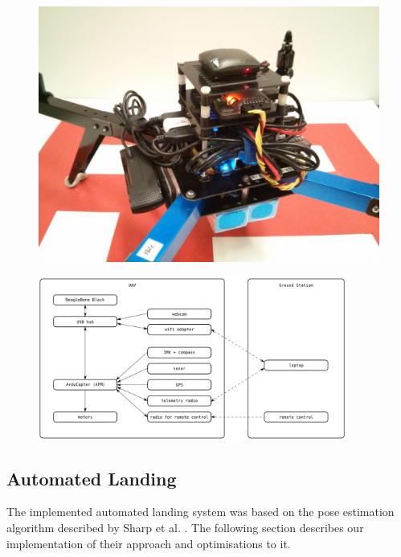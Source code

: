 \documentclass{acm_proc_article-sp}
\begin{document}
\begin{figure}
\centering
\begin{minipage}{.5\textwidth}
  \centering
  \includegraphics[width=.7\linewidth]{images/hardware.jpg}
  \label{fig:hardware-photo}
\end{minipage}%
\begin{minipage}{.5\textwidth}
\centering
\includegraphics[width=0.9\textwidth]{images/architecture.png}
\label{fig:hardware-arch}
\end{minipage}
\end{figure}

\subsection{Automated Landing}
The implemented automated landing system was based on the pose estimation algorithm described by Sharp et al. \cite{sharp_et_al_2001}. The following section describes our implementation of their approach and optimisations to it. 
\end{document}
